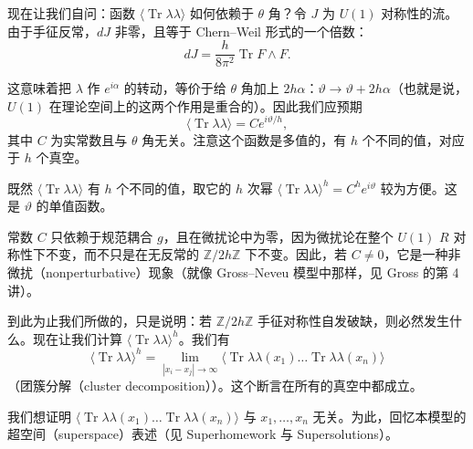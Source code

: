 
现在让我们自问：函数 $\langle\operatorname{Tr}\lambda\lambda\rangle$ 如何依赖于 $\theta$ 角？令 $J$ 为 $U(1)$ 对称性的流。由于手征反常，$dJ$ 非零，且等于 Chern--Weil 形式的一个倍数：
\begin{equation}
  \tag{16.4}
  \label{eq:16-4}
  dJ=\frac{h}{8\pi^2}\operatorname{Tr}F\wedge F .
\end{equation}

这意味着把 $\lambda$ 作 $e^{i\alpha}$ 的转动，等价于给 $\theta$ 角加上 $2h\alpha$：$\vartheta\to\vartheta+2h\alpha$（也就是说，$U(1)$ 在理论空间上的这两个作用是重合的）。因此我们应预期
\[
\langle\operatorname{Tr}\lambda\lambda\rangle=Ce^{i\vartheta/h},
\]
其中 $C$ 为实常数且与 $\theta$ 角无关。注意这个函数是多值的，有 $h$ 个不同的值，对应于 $h$ 个真空。

既然 $\langle\operatorname{Tr}\lambda\lambda\rangle$ 有 $h$ 个不同的值，取它的 $h$ 次幂 $\langle\operatorname{Tr}\lambda\lambda\rangle^h=C^he^{i\vartheta}$ 较为方便。这是 $\vartheta$ 的单值函数。

常数 $C$ 只依赖于规范耦合 $g$，且在微扰论中为零，因为微扰论在整个 $U(1)$ $R$ 对称性下不变，而不只是在无反常的 $\mathbb{Z}/2h\mathbb{Z}$ 下不变。因此，若 $C\ne0$，它是一种非微扰（nonperturbative）现象（就像 Gross--Neveu 模型中那样，见 Gross 的第 4 讲）。

到此为止我们所做的，只是说明：若 $\mathbb{Z}/2h\mathbb{Z}$ 手征对称性自发破缺，则必然发生什么。现在让我们计算 $\langle\operatorname{Tr}\lambda\lambda\rangle^h$。我们有
\begin{equation}
  \tag{16.5}
  \label{eq:16-5}
  \langle\operatorname{Tr}\lambda\lambda\rangle^h=\lim_{|x_i-x_j|\to\infty}\langle\operatorname{Tr}\lambda\lambda(x_1)\dots\operatorname{Tr}\lambda\lambda(x_n)\rangle
\end{equation}
（团簇分解（cluster decomposition））。这个断言在所有的真空中都成立。


我们想证明 $\langle\operatorname{Tr}\lambda\lambda(x_1)\dots\operatorname{Tr}\lambda\lambda(x_n)\rangle$ 与 $x_1,\dots,x_n$ 无关。为此，回忆本模型的超空间（superspace）表述（见 Superhomework 与 Supersolutions）。

